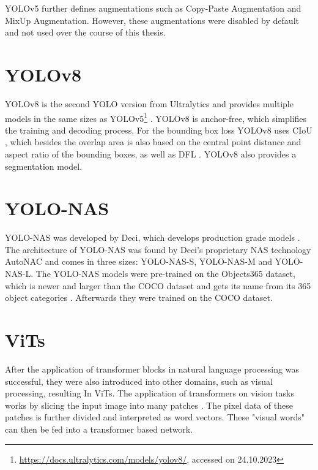 \documentclass[10pt]{book}
\begin{document}
\ac{YOLO}v5 further defines augmentations such as Copy-Paste Augmentation and MixUp Augmentation. However, these augmentations were disabled by default and not used over the course of this thesis.

\section{YOLOv8}

\ac{YOLO}v8 is the second \ac{YOLO} version from Ultralytics and provides multiple models in the same sizes as \ac{YOLO}v5\footnote{\url{https://docs.ultralytics.com/models/yolov8/}, accessed on 24.10.2023} \cite{terven2023comprehensive}. \ac{YOLO}v8 is anchor-free, which simplifies the training and decoding process. For the bounding box loss \ac{YOLO}v8 uses \ac{CIoU} \cite{zheng2020distance}, which besides the overlap area is also based on the central point distance and aspect ratio of the bounding boxes, as well as \ac{DFL} \cite{li2020generalized}. \ac{YOLO}v8 also provides a segmentation model.

\section{YOLO-NAS}

\ac{YOLO}-NAS was developed by Deci, which develops production grade models \cite{terven2023comprehensive}. The architecture of \ac{YOLO}-NAS was found by Deci's proprietary \ac{NAS} technology AutoNAC and comes in three sizes: \ac{YOLO}-NAS-S, \ac{YOLO}-NAS-M and \ac{YOLO}-NAS-L. The \ac{YOLO}-NAS models were pre-trained on the Objects365 dataset, which is newer and larger than the \ac{COCO} dataset and gets its name from its 365 object categories \cite{shao2019objects365}. Afterwards they were trained on the \ac{COCO} dataset.


\section{ViTs}

After the application of transformer blocks in natural language processing was successful, they were also introduced into other domains, such as visual processing, resulting In \acp{ViT}. The application of transformers on vision tasks works by slicing the input image into many patches \cite{dosovitskiy2020image}. The pixel data of these patches is further divided and interpreted as word vectors. These "visual words" can then be fed into a transformer based network.
\end{document}
